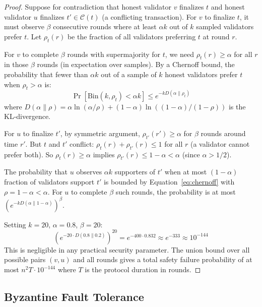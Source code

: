 \documentclass[11pt,a4paper]{article}
\begin{document}
\begin{proof}
Suppose for contradiction that honest validator $v$ finalizes $t$ and honest validator $u$
finalizes $t' \in \mathcal{C}(t)$ (a conflicting transaction). For $v$ to finalize $t$,
it must observe $\beta$ consecutive rounds where at least $\alpha k$ out of $k$ sampled
validators prefer $t$. Let $\rho_t(r)$ be the fraction of all validators preferring $t$
at round $r$.

For $v$ to complete $\beta$ rounds with supermajority for $t$, we need $\rho_t(r) \geq \alpha$
for all $r$ in those $\beta$ rounds (in expectation over samples). By a Chernoff bound,
the probability that fewer than $\alpha k$ out of a sample of $k$ honest validators
prefer $t$ when $\rho_t > \alpha$ is:
\begin{equation}
\Pr[\text{Bin}(k, \rho_t) < \alpha k] \leq e^{-k D(\alpha \| \rho_t)}
\label{eq:chernoff}
\end{equation}
where $D(\alpha \| \rho) = \alpha \ln(\alpha/\rho) + (1-\alpha)\ln((1-\alpha)/(1-\rho))$
is the KL-divergence.

For $u$ to finalize $t'$, by symmetric argument, $\rho_{t'}(r') \geq \alpha$ for $\beta$
rounds around time $r'$. But $t$ and $t'$ conflict: $\rho_t(r) + \rho_{t'}(r) \leq 1$
for all $r$ (a validator cannot prefer both). So $\rho_t(r) \geq \alpha$ implies
$\rho_{t'}(r) \leq 1 - \alpha < \alpha$ (since $\alpha > 1/2$).

The probability that $u$ observes $\alpha k$ supporters of $t'$ when at most $(1-\alpha)$
fraction of validators support $t'$ is bounded by Equation~\ref{eq:chernoff} with
$\rho = 1 - \alpha < \alpha$. For $u$ to complete $\beta$ such rounds, the probability
is at most $(e^{-k D(\alpha \| 1-\alpha)})^\beta$.

Setting $k = 20$, $\alpha = 0.8$, $\beta = 20$:
\begin{equation}
(e^{-20 \cdot D(0.8 \| 0.2)})^{20} = e^{-400 \cdot 0.832} \approx e^{-333} \approx 10^{-144}
\end{equation}
This is negligible in any practical security parameter. The union bound over all possible
pairs $(v, u)$ and all rounds gives a total safety failure probability of at most
$n^2 T \cdot 10^{-144}$ where $T$ is the protocol duration in rounds.
\end{proof}

\subsection{Byzantine Fault Tolerance}
\end{document}
